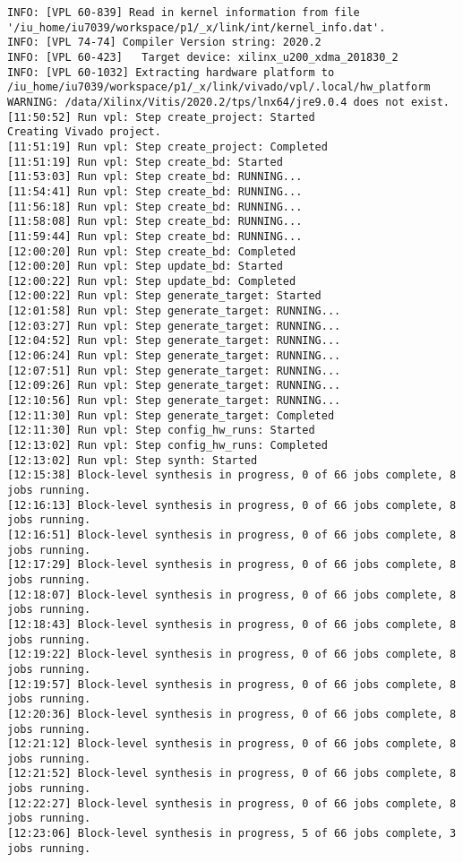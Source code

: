 \begin{lstlisting}[label=lst:lev_rec,caption=Содержимое log-файла]
INFO: [VPL 60-839] Read in kernel information from file '/iu_home/iu7039/workspace/p1/_x/link/int/kernel_info.dat'.
INFO: [VPL 74-74] Compiler Version string: 2020.2
INFO: [VPL 60-423]   Target device: xilinx_u200_xdma_201830_2
INFO: [VPL 60-1032] Extracting hardware platform to /iu_home/iu7039/workspace/p1/_x/link/vivado/vpl/.local/hw_platform
WARNING: /data/Xilinx/Vitis/2020.2/tps/lnx64/jre9.0.4 does not exist.
[11:50:52] Run vpl: Step create_project: Started
Creating Vivado project.
[11:51:19] Run vpl: Step create_project: Completed
[11:51:19] Run vpl: Step create_bd: Started
[11:53:03] Run vpl: Step create_bd: RUNNING...
[11:54:41] Run vpl: Step create_bd: RUNNING...
[11:56:18] Run vpl: Step create_bd: RUNNING...
[11:58:08] Run vpl: Step create_bd: RUNNING...
[11:59:44] Run vpl: Step create_bd: RUNNING...
[12:00:20] Run vpl: Step create_bd: Completed
[12:00:20] Run vpl: Step update_bd: Started
[12:00:22] Run vpl: Step update_bd: Completed
[12:00:22] Run vpl: Step generate_target: Started
[12:01:58] Run vpl: Step generate_target: RUNNING...
[12:03:27] Run vpl: Step generate_target: RUNNING...
[12:04:52] Run vpl: Step generate_target: RUNNING...
[12:06:24] Run vpl: Step generate_target: RUNNING...
[12:07:51] Run vpl: Step generate_target: RUNNING...
[12:09:26] Run vpl: Step generate_target: RUNNING...
[12:10:56] Run vpl: Step generate_target: RUNNING...
[12:11:30] Run vpl: Step generate_target: Completed
[12:11:30] Run vpl: Step config_hw_runs: Started
[12:13:02] Run vpl: Step config_hw_runs: Completed
[12:13:02] Run vpl: Step synth: Started
[12:15:38] Block-level synthesis in progress, 0 of 66 jobs complete, 8 jobs running.
[12:16:13] Block-level synthesis in progress, 0 of 66 jobs complete, 8 jobs running.
[12:16:51] Block-level synthesis in progress, 0 of 66 jobs complete, 8 jobs running.
[12:17:29] Block-level synthesis in progress, 0 of 66 jobs complete, 8 jobs running.
[12:18:07] Block-level synthesis in progress, 0 of 66 jobs complete, 8 jobs running.
[12:18:43] Block-level synthesis in progress, 0 of 66 jobs complete, 8 jobs running.
[12:19:22] Block-level synthesis in progress, 0 of 66 jobs complete, 8 jobs running.
[12:19:57] Block-level synthesis in progress, 0 of 66 jobs complete, 8 jobs running.
[12:20:36] Block-level synthesis in progress, 0 of 66 jobs complete, 8 jobs running.
[12:21:12] Block-level synthesis in progress, 0 of 66 jobs complete, 8 jobs running.
[12:21:52] Block-level synthesis in progress, 0 of 66 jobs complete, 8 jobs running.
[12:22:27] Block-level synthesis in progress, 0 of 66 jobs complete, 8 jobs running.
[12:23:06] Block-level synthesis in progress, 5 of 66 jobs complete, 3 jobs running.

\end{lstlisting}
